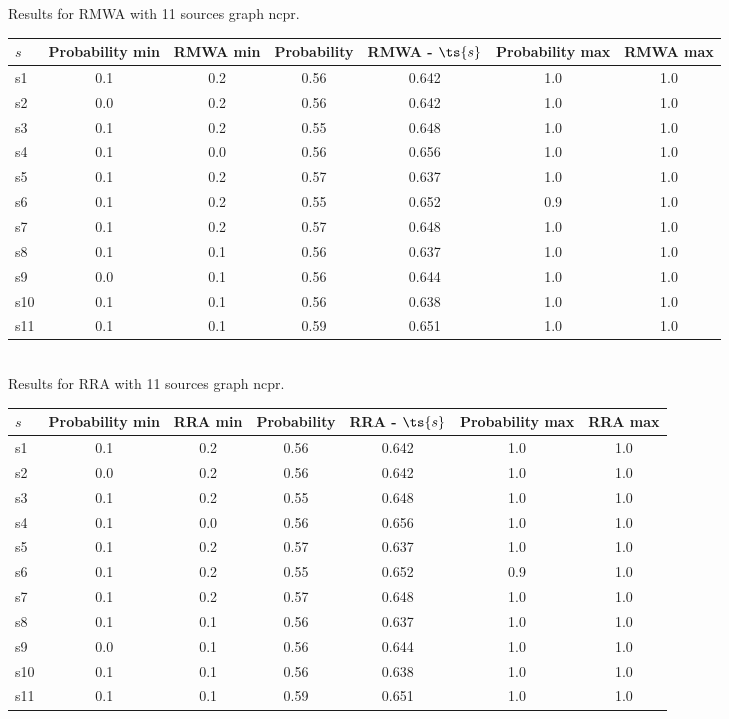 \documentclass{article}
\begin{document}
\noindent Results for RMWA with 11 sources graph ncpr.

\noindent\begin{tabular}{|l|c|c|c|c|c|c|}
\hline
$s$& Probability min & RMWA min & Probability & RMWA - $\ts{s}$ & Probability max & RMWA max\\
\hline
s1 &0.1 & 0.2 & 0.56 & 0.642 & 1.0 & 1.0\\
\hline
s2 &0.0 & 0.2 & 0.56 & 0.642 & 1.0 & 1.0\\
\hline
s3 &0.1 & 0.2 & 0.55 & 0.648 & 1.0 & 1.0\\
\hline
s4 &0.1 & 0.0 & 0.56 & 0.656 & 1.0 & 1.0\\
\hline
s5 &0.1 & 0.2 & 0.57 & 0.637 & 1.0 & 1.0\\
\hline
s6 &0.1 & 0.2 & 0.55 & 0.652 & 0.9 & 1.0\\
\hline
s7 &0.1 & 0.2 & 0.57 & 0.648 & 1.0 & 1.0\\
\hline
s8 &0.1 & 0.1 & 0.56 & 0.637 & 1.0 & 1.0\\
\hline
s9 &0.0 & 0.1 & 0.56 & 0.644 & 1.0 & 1.0\\
\hline
s10 &0.1 & 0.1 & 0.56 & 0.638 & 1.0 & 1.0\\
\hline
s11 &0.1 & 0.1 & 0.59 & 0.651 & 1.0 & 1.0\\
\hline
\end{tabular}\\

\noindent Results for RRA with 11 sources graph ncpr.

\noindent\begin{tabular}{|l|c|c|c|c|c|c|}
\hline
$s$& Probability min & RRA min & Probability & RRA - $\ts{s}$ & Probability max & RRA max\\
\hline
s1 &0.1 & 0.2 & 0.56 & 0.642 & 1.0 & 1.0\\
\hline
s2 &0.0 & 0.2 & 0.56 & 0.642 & 1.0 & 1.0\\
\hline
s3 &0.1 & 0.2 & 0.55 & 0.648 & 1.0 & 1.0\\
\hline
s4 &0.1 & 0.0 & 0.56 & 0.656 & 1.0 & 1.0\\
\hline
s5 &0.1 & 0.2 & 0.57 & 0.637 & 1.0 & 1.0\\
\hline
s6 &0.1 & 0.2 & 0.55 & 0.652 & 0.9 & 1.0\\
\hline
s7 &0.1 & 0.2 & 0.57 & 0.648 & 1.0 & 1.0\\
\hline
s8 &0.1 & 0.1 & 0.56 & 0.637 & 1.0 & 1.0\\
\hline
s9 &0.0 & 0.1 & 0.56 & 0.644 & 1.0 & 1.0\\
\hline
s10 &0.1 & 0.1 & 0.56 & 0.638 & 1.0 & 1.0\\
\hline
s11 &0.1 & 0.1 & 0.59 & 0.651 & 1.0 & 1.0\\
\hline
\end{tabular}\\
\end{document}
